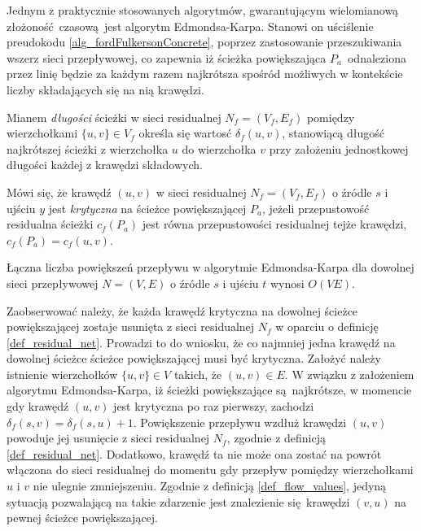 \par{
  Jednym z praktycznie stosowanych algorytmów, gwarantującym wielomianową złożoność czasową jest algorytm Edmondsa-Karpa.
  Stanowi on uściślenie preudokodu \ref{alg_fordFulkersonConcrete}, poprzez zastosowanie przeszukiwania wszerz sieci przepływowej, co zapewnia iż ścieżka powiększająca $P_a$ odnaleziona przez linię  będzie za każdym razem najkrótsza spośród możliwych w kontekście liczby składających się na nią krawędzi.
  \begin{definition}
    Mianem \emph{długości} ścieżki w sieci residualnej $N_f=(V_f, E_f)$ pomiędzy wierzchołkami $\{u, v\} \in V_f$ określa się wartosć $\delta_f(u, v)$, stanowiącą długość najkrótszej ścieżki z wierzchołka $u$ do wierzchołka $v$ przy założeniu jednostkowej długości każdej z krawędzi składowych.
  \end{definition}
  \begin{definition}
    Mówi się, że krawędź $(u, v)$ w sieci residualnej $N_f=(V_f, E_f)$ o źródle $s$ i ujściu $y$ jest \emph{krytyczna} na ścieżce powiększającej $P_a$, jeżeli przepustowość residualna ścieżki $c_f(P_a)$ jest równa przepustowości residualnej tejże krawędzi, $c_f(P_a)=c_f(u, v)$.
  \end{definition}
  \begin{theorem}
    Łączna liczba powiększeń przepływu w algorytmie Edmondsa-Karpa dla dowolnej sieci przepływowej $N=(V, E)$ o źródle $s$ i ujściu $t$ wynosi $O(VE)$.
  \end{theorem}
  \begin{bproof}
    Zaobserwować należy, że każda krawędź krytyczna na dowolnej ścieżce powiększającej zostaje usunięta z sieci residualnej $N_f$ w oparciu o definicję \ref{def_residual_net}.
    Prowadzi to do wniosku, że co najmniej jedna krawędź na dowolnej ścieżce ścieżce powiększającej musi być krytyczna.
    Założyć należy istnienie wierzchołków $\{u, v\} \in V$ takich, że $(u, v) \in E$.
    W związku z założeniem algorytmu Edmondsa-Karpa, iż ścieżki powiększające są najkrótsze, w momencie gdy krawędź $(u, v)$ jest krytyczna po raz pierwszy, zachodzi $\delta_f(s, v)=\delta_f(s, u)+1$.
    Powiększenie przepływu wzdłuż krawędzi $(u, v)$ powoduje jej usunięcie z sieci residualnej $N_f$, zgodnie z definicją \ref{def_residual_net}.
    Dodatkowo, krawędź ta nie może ona zostać na powrót włączona do sieci residualnej do momentu gdy przepływ pomiędzy wierzchołkami $u$ i $v$ nie ulegnie zmniejszeniu.
    Zgodnie z definicją \ref{def_flow_values}, jedyną sytuacją pozwalającą na takie zdarzenie jest znalezienie się krawędzi $(v, u)$ na pewnej ścieżce powiększającej.

\end{bproof}}

